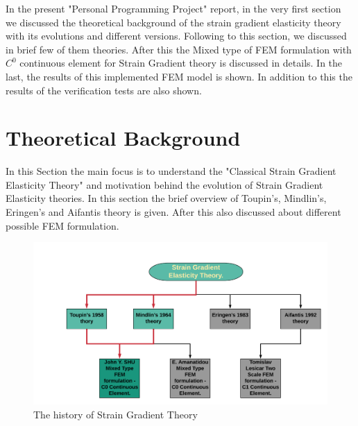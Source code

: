 \documentclass[12pt]{article}
\begin{document}
\newline  
\par
In the present "Personal Programming Project" report, in the very first section we discussed the theoretical background of the strain gradient elasticity theory with its evolutions and different versions. Following to this section, we discussed in brief few of them theories. After this the Mixed type of FEM formulation with $C^{0}$ continuous element for Strain Gradient theory is discussed in details. In the last, the results of this implemented FEM model is shown. In addition to this the results of the verification tests are also shown.
\newpage
 
\section{Theoretical Background}
In this Section the main focus is to understand the "Classical Strain Gradient Elasticity Theory" and motivation behind the evolution of Strain Gradient Elasticity theories. In this section the brief overview of Toupin's, Mindlin's, Eringen's and Aifantis theory is given. After this also discussed about different possible FEM formulation.  
     \begin{figure}[H]
     	\begin{center}
     	     	\includegraphics[scale=0.5]{straingradienthistory.png}
     	\end{center}
     	\caption{The history of Strain Gradient Theory}
     \end{figure}
\end{document}
